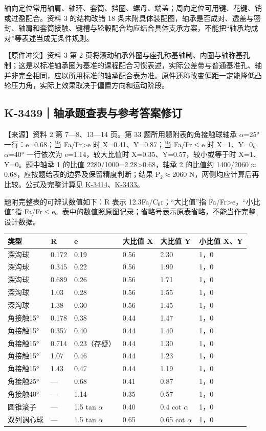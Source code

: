 \documentclass[zihao=5,a4paper,UTF8,fontset=fandol]{ctexart}
\begin{document}
轴向定位常用轴肩、轴环、套筒、挡圈、螺母、端盖；周向定位可用键、花键、销或过盈配合。资料 3 的结构改错 18 条未附具体装配图，轴承是否成对、透盖与密封、轴肩和套筒接触、键槽与轮毂配合均应结合具体支承方案，不能把“轴承均成对”等表述当成无条件规则。


【原件冲突】资料 3 第 2 页将滚动轴承外圈与座孔称基轴制、内圈与轴称基孔制；这是以标准轴承圈为基准的课程配合习惯表述，实际公差带与普通基准孔、轴并非完全相同，应以所用标准的轴承配合表为准。原件还称改变偏距一定能降低凸轮压力角，实际上效果取决于偏置方向和运动阶段。





\subsection{K-3439｜轴承题查表与参考答案修订}
\label{k-3439}

【来源】资料 2 第 7—8、13—14 页。第 33 题所用题附表的角接触球轴承 $\alpha$=25° 一行：e=0.68；当 Fa/Fr>e 时 X=0.41、Y=0.87；当 Fa/Fr$\le$e 时 X=1、Y=0。$\alpha$=40° 一行依次为 e=1.14，较大比值时 X=0.35、Y=0.57，较小或等于时 X=1、Y=0。题中轴承 1 的比值 2280/1000=2.28>0.68，轴承 2 的比值约 1400/2060$\approx$0.68，应按题给表的边界及保留精度判断；结果 P$_{2}$$\approx$2060 N，两侧均应计算后再比较。公式及完整计算见 \hyperref[k-3414]{K-3414}、\hyperref[k-3433]{K-3433}。


题附完整表的可辨认数值如下：R 表示 12.3Fa/C$_{0}$r；“大比值”指 Fa/Fr>e，“小比值”指 Fa/Fr$\le$e。表中的数值照原图记录；省略号表示原表省略，不能当作完整设计数据。


\begin{longtable}{p{2.21cm}p{2.21cm}p{2.21cm}p{2.21cm}p{2.21cm}p{2.21cm}}
\toprule
类型 & R & e & 大比值 X & 大比值 Y & 小比值 X、Y \\

\midrule
\endhead
深沟球 & 0.172 & 0.19 & 0.56 & 2.30 & 1，0 \\
深沟球 & 0.345 & 0.22 & 0.56 & 1.99 & 1，0 \\
深沟球 & 0.689 & 0.26 & 0.56 & 1.71 & 1，0 \\
深沟球 & 1.03 & 0.28 & 0.56 & 1.55 & 1，0 \\
深沟球 & 1.38 & 0.30 & 0.56 & 1.45 & 1，0 \\
角接触15° & 0.178 & 0.38 & 0.44 & 1.47 & 1，0 \\
角接触15° & 0.357 & 0.40 & 0.44 & 1.40 & 1，0 \\
角接触15° & 0.714 & 0.23（存疑） & 0.44 & 1.30 & 1，0 \\
角接触15° & 1.07 & 0.46 & 0.44 & 1.23 & 1，0 \\
角接触15° & 1.43 & 0.47 & 0.44 & 1.19 & 1，0 \\
角接触25° & — & 0.68 & 0.41 & 0.87 & 1，0 \\
角接触40° & — & 1.14 & 0.35 & 0.57 & 1，0 \\
圆锥滚子 & — & 1.5 tan $\alpha$ & 0.40 & 0.4 cot $\alpha$ & 1，0 \\
双列调心球 & — & 1.5 tan $\alpha$ & 0.65 & 0.65 cot $\alpha$ & 1，0 \\
\bottomrule
\end{longtable}
\end{document}
